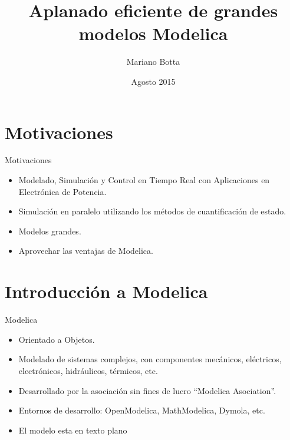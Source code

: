 \documentclass[aspectratio=169,10pt]{beamer}
\title{Aplanado eficiente de grandes modelos Modelica}
\author[M.Botta] {Mariano Botta }
\institute[UNR] %
{ FCEIA, UNR }
\date {Agosto 2015}
\begin{document}
\begin{frame}
  \titlepage
\end{frame}

 
\section{Motivaciones}  

\begin{frame}{Motivaciones}
    \begin{itemize}
     \item Modelado, Simulaci\'on y Control en Tiempo Real con Aplicaciones en Electr\'onica de Potencia.
     \item Simulaci\'on en paralelo utilizando los m\'etodos de cuantificaci\'on de estado.  
     \item Modelos grandes.
     \item Aprovechar las ventajas de Modelica.
    \end{itemize}
\end{frame}

\section{Introducci\'on a Modelica}



\begin{frame}{Modelica} 
    \begin{itemize}
        \item Orientado a Objetos.
        \item Modelado de sistemas complejos, con componentes mec\'anicos, el\'ectricos, electr\'onicos, hidr\'aulicos, t\'ermicos, etc.     
        \item Desarrollado por la asociaci\'on sin fines de lucro ``Modelica Asociation''.
        \item Entornos de desarrollo: OpenModelica, MathModelica, Dymola, etc.
        
        \item El modelo esta en texto plano
    \end{itemize}
\end{frame}
 
\end{document}
